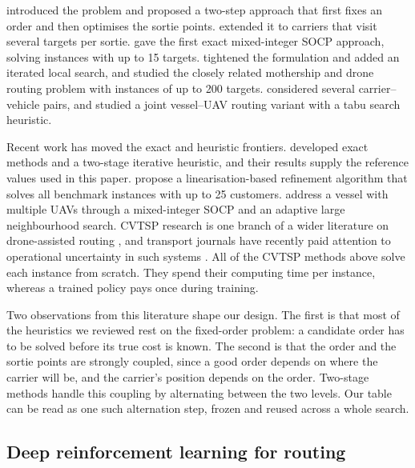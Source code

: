 \documentclass[preprint,12pt,authoryear]{elsarticle}
\begin{document}
\citet{garone2011} introduced the problem and proposed a two-step approach that first fixes an order and then optimises the sortie points. \citet{garone2014} extended it to carriers that visit several targets per sortie. \citet{gambella2018} gave the first exact mixed-integer SOCP approach, solving instances with up to 15 targets. \citet{erdogan2021} tightened the formulation and added an iterated local search, and \citet{poikonen2020} studied the closely related mothership and drone routing problem with instances of up to 200 targets. \citet{fahradyan2020} considered several carrier--vehicle pairs, and \citet{liy2024} studied a joint vessel--UAV routing variant with a tabu search heuristic.

Recent work has moved the exact and heuristic frontiers. \citet{li2025} developed exact methods and a two-stage iterative heuristic, and their results supply the reference values used in this paper. \citet{vieira2026} propose a linearisation-based refinement algorithm that solves all benchmark instances with up to 25 customers. \citet{ren2026} address a vessel with multiple UAVs through a mixed-integer SOCP and an adaptive large neighbourhood search. CVTSP research is one branch of a wider literature on drone-assisted routing \citep{murray2015,agatz2018,otto2018,macrina2020,chung2020}, and transport journals have recently paid attention to operational uncertainty in such systems \citep{zhao2022}. All of the CVTSP methods above solve each instance from scratch. They spend their computing time per instance, whereas a trained policy pays once during training.

Two observations from this literature shape our design. The first is that most of the heuristics we reviewed rest on the fixed-order problem: a candidate order has to be solved before its true cost is known. The second is that the order and the sortie points are strongly coupled, since a good order depends on where the carrier will be, and the carrier's position depends on the order. Two-stage methods handle this coupling by alternating between the two levels. Our table can be read as one such alternation step, frozen and reused across a whole search.

\subsection{Deep reinforcement learning for routing}
\end{document}
